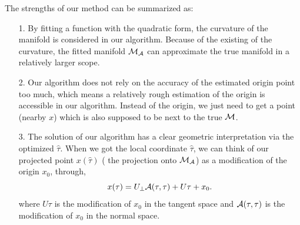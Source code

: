 \documentclass{article}
\theoremstyle{remark}
\begin{document}
The strengths of our method can be summarized as:
\begin{itemize}
\item[1.] By fitting a function with the quadratic form, the curvature of the manifold is considered in our algorithm. Because of the existing of the curvature, the fitted manifold ${\cal M}_{\cal A}$ can approximate the true manifold in a relatively larger scope.
\item[2.] Our algorithm does not rely on the accuracy of the estimated origin point too much, which means a relatively rough estimation of the origin is accessible in our algorithm. Instead of the origin, we just need to get a point (nearby $x$) which is also supposed to be next to the true $\cal M$.
\item[3.] The solution of our algorithm has a clear geometric interpretation via the optimized $\hat{\tau}$.  When we got the local coordinate $\hat{\tau}$, we can think of our projected point $x(\hat{\tau})$ ( the projection onto ${\cal M}_{\cal A}$) as a modification of the origin $x_0$, through,
\[
x(\tau) = U_\perp {\cal A}(\tau,\tau) + U\tau + x_0. 
\]
where $U\tau$ is the modification of $x_0$ in the tangent space and ${\cal A}(\tau,\tau)$ is the modification of $x_0$ in the normal space.
\end{itemize}
\end{document}
